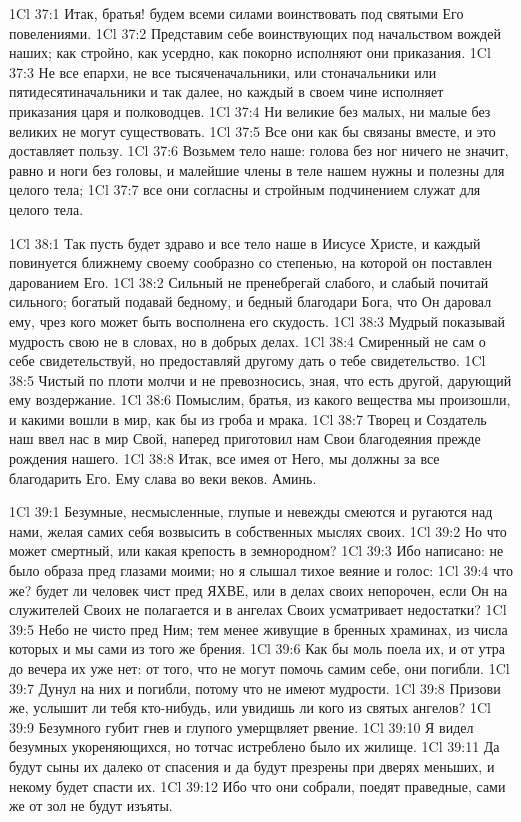 \vs 1Cl 37:1
Итак, братья! будем всеми
силами воинствовать под святыми Его повелениями.
\vs 1Cl 37:2
Представим себе
воинствующих под начальством вождей наших; как стройно, как усердно, как
покорно исполняют они приказания.
\vs 1Cl 37:3
Не все епархи, не все
тысяченачальники, или стоначальники или пятидесятиначальники и так далее, но
каждый в своем чине исполняет приказания царя и полководцев.
\vs 1Cl 37:4
Ни великие без малых, ни
малые без великих не могут существовать.
\vs 1Cl 37:5
Все они как бы связаны
вместе, и это доставляет пользу.
\vs 1Cl 37:6
Возьмем тело наше: голова
без ног ничего не значит, равно и ноги без головы, и малейшие члены в теле
нашем нужны и полезны для целого тела;
\vs 1Cl 37:7
все они согласны и
стройным подчинением служат для целого тела.

\vs 1Cl 38:1
Так пусть будет здраво и
все тело наше в Иисусе Христе, и каждый повинуется ближнему своему сообразно
со степенью, на которой он поставлен дарованием Его.
\vs 1Cl 38:2
Сильный не пренебрегай
слабого, и слабый почитай сильного; богатый подавай бедному, и бедный
благодари Бога, что Он даровал ему, чрез кого может быть восполнена его
скудость.
\vs 1Cl 38:3
Мудрый показывай мудрость
свою не в словах, но в добрых делах.
\vs 1Cl 38:4
Смиренный не сам о себе
свидетельствуй, но предоставляй другому дать о тебе свидетельство.
\vs 1Cl 38:5
Чистый по плоти молчи и не
превозносись, зная, что есть другой, дарующий ему воздержание.
\vs 1Cl 38:6
Помыслим, братья, из
какого вещества мы произошли, и какими вошли в мир, как бы из гроба и мрака.
\vs 1Cl 38:7
Творец и Создатель наш
ввел нас в мир Свой, наперед приготовил нам Свои благодеяния прежде рождения
нашего.
\vs 1Cl 38:8
Итак, все имея от Него, мы
должны за все благодарить Его. Ему слава во веки веков. Аминь.

\vs 1Cl 39:1
Безумные, несмысленные,
глупые и невежды смеются и ругаются над нами, желая самих себя возвысить в
собственных мыслях своих.
\vs 1Cl 39:2
Но что может смертный, или
какая крепость в земнородном?
\vs 1Cl 39:3
Ибо написано: не было
образа пред глазами моими; но я слышал тихое веяние и голос:
\vs 1Cl 39:4
что же? будет ли человек
чист пред ЯХВЕ, или в делах своих непорочен, если Он на служителей Своих не
полагается и в ангелах Своих усматривает недостатки?
\vs 1Cl 39:5
Небо не чисто пред Ним;
тем менее живущие в бренных храминах, из числа которых и мы сами из того же
брения.
\vs 1Cl 39:6
Как бы моль поела их, и от
утра до вечера их уже нет: от того, что не могут помочь самим себе, они
погибли.
\vs 1Cl 39:7
Дунул на них и погибли,
потому что не имеют мудрости.
\vs 1Cl 39:8
Призови же, услышит ли
тебя кто-нибудь, или увидишь ли кого из святых ангелов?
\vs 1Cl 39:9
Безумного губит гнев и
глупого умерщвляет рвение.
\vs 1Cl 39:10
Я видел безумных
укореняющихся, но тотчас истреблено было их жилище.
\vs 1Cl 39:11
Да будут сыны их далеко
от спасения и да будут презрены при дверях меньших, и некому будет спасти их.
\vs 1Cl 39:12
Ибо что они собрали,
поедят праведные, сами же от зол не будут изъяты.

